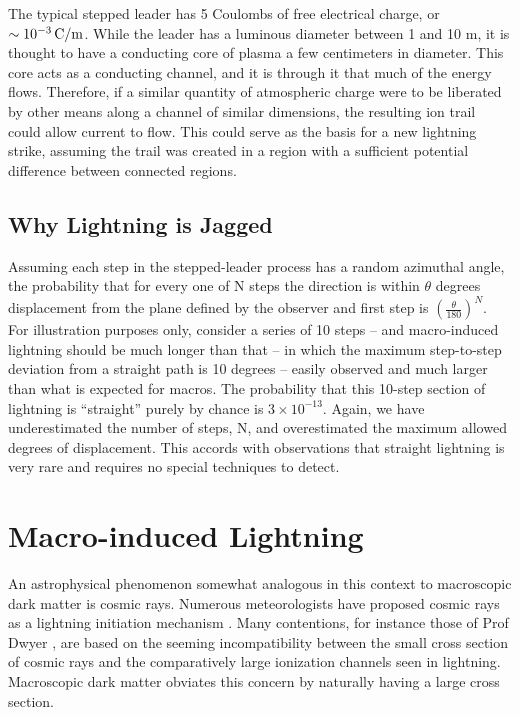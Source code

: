 \documentclass[%
 reprint,
 amsmath,amssymb,
 aps,
]{revtex4-2}
\newcommand{\vtwo}[1]{{\color{black} #1}}
\newcommand{\vfour}[1]{{\color{red} #1}}
\begin{document}
    The typical stepped leader has 5 Coulombs of free electrical charge, or $\sim10^{-3} \, \rm{C/m}$. While the leader has a luminous diameter between 1 and 10 m, it is thought to have a conducting core of plasma a few centimeters in diameter. This core acts as a conducting channel, and it is through it that much of the energy flows. \vfour{Therefore, if a similar quantity of atmospheric charge were to be liberated by other means along a channel of similar dimensions, the resulting ion trail could allow current to flow. This could serve as the basis for a new lightning strike, assuming the trail was created in a region with a sufficient potential difference between connected regions.}
    
    
    \subsection*{Why Lightning is Jagged} %
    \label{sub:why_lightning_is_jagged}

        \vtwo{Assuming each step in the stepped-leader process has a random azimuthal angle, the probability that for every one of N steps the direction is within $\theta$ degrees displacement from the plane defined by the observer and first step is $\left(\frac{\theta}{180}\right)^{N}$. For illustration purposes only, \vfour{consider a series of 10 steps  -- and macro-induced lightning should be much longer than that -- in which the maximum step-to-step deviation from a straight path is 10 degrees -- easily observed and much larger than what is expected for macros.}
        The probability that \vfour{this} 10-step section of lightning is ``straight'' purely by chance is $3 \times 10^{-13}$. Again, we have underestimated the number of steps, N, and overestimated the maximum allowed degrees of displacement. This accords with observations that straight lightning is very rare and requires no special techniques to detect.}
        



\section{Macro-induced \textbf{}Lightning} %
\label{sec:macro_induced_lightning}

    \vtwo{An astrophysical phenomenon somewhat analogous in this context to macroscopic dark matter is cosmic rays. Numerous meteorologists have proposed cosmic rays as a lightning initiation mechanism \citep{Babich2012}. Many contentions, for instance those of Prof Dwyer \citep{scientific_american_2008}, are based on the seeming incompatibility between the small cross section of cosmic rays and the comparatively large ionization channels seen in lightning. Macroscopic dark matter obviates this concern by naturally having a large cross section.}
\end{document}
